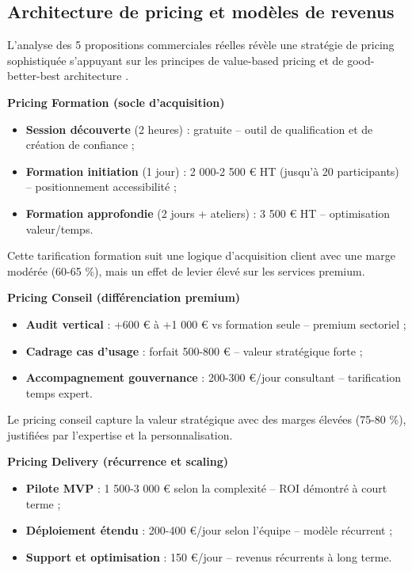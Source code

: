 \subsection{Architecture de pricing et modèles de revenus}

L'analyse des 5 propositions commerciales réelles \cite{luwai2025aesio,luwai2025antilogy,luwai2025integrhale,luwai2025carecall,luwai2025tectona} révèle une stratégie de pricing sophistiquée s'appuyant sur les principes de value-based pricing et de good-better-best architecture \cite{nagle2011strategy}.

\textbf{Pricing Formation (socle d'acquisition)}
\begin{itemize}
    \item \textbf{Session découverte} (2 heures) : gratuite – outil de qualification et de création de confiance ;
    \item \textbf{Formation initiation} (1 jour) : 2 000-2 500 € HT (jusqu'à 20 participants) – positionnement accessibilité ;
    \item \textbf{Formation approfondie} (2 jours + ateliers) : 3 500 € HT – optimisation valeur/temps.
\end{itemize}

Cette tarification formation suit une logique d'acquisition client avec une marge modérée (60-65 \%), mais un effet de levier élevé sur les services premium.

\textbf{Pricing Conseil (différenciation premium)}
\begin{itemize}
    \item \textbf{Audit vertical} : +600 € à +1 000 € vs formation seule – premium sectoriel ;
    \item \textbf{Cadrage cas d'usage} : forfait 500-800 € – valeur stratégique forte ;
    \item \textbf{Accompagnement gouvernance} : 200-300 €/jour consultant – tarification temps expert.
\end{itemize}

Le pricing conseil capture la valeur stratégique avec des marges élevées (75-80 \%), justifiées par l'expertise et la personnalisation.

\textbf{Pricing Delivery (récurrence et scaling)}
\begin{itemize}
    \item \textbf{Pilote MVP} : 1 500-3 000 € selon la complexité – ROI démontré à court terme ;
    \item \textbf{Déploiement étendu} : 200-400 €/jour selon l'équipe – modèle récurrent ;
    \item \textbf{Support et optimisation} : 150 €/jour – revenus récurrents à long terme.
\end{itemize}

